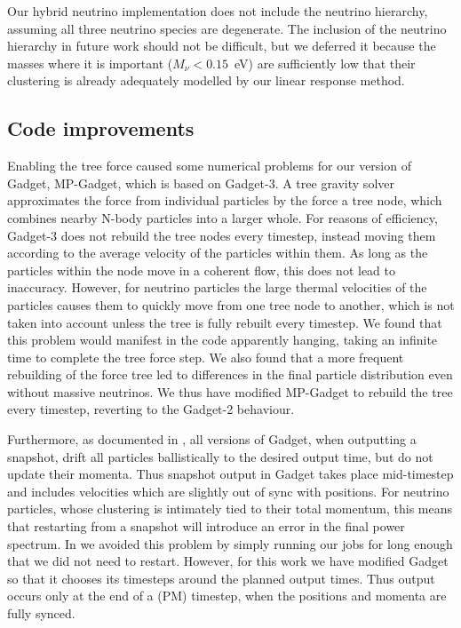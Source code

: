 \documentclass[useAMS, usenatbib]{mnras}
\begin{document}
Our hybrid neutrino implementation does not include the neutrino hierarchy, assuming all three neutrino species are degenerate. The inclusion of the neutrino hierarchy in future work should not be difficult, but we deferred it because the masses where it is important ($M_\nu < 0.15$~eV) are sufficiently low that their clustering is already adequately modelled by our linear response method.

\subsection{Code improvements}
\label{sec:code}

Enabling the tree force caused some numerical problems for our version of Gadget, MP-Gadget, which is based on Gadget-3.
A tree gravity solver approximates the force from individual particles by the force a tree node, which combines nearby N-body particles into a larger whole. For reasons of efficiency, Gadget-3 does not rebuild the tree nodes every timestep, instead moving them according to the average velocity of the particles within them. As long as the particles within the node move in a coherent flow, this does not lead to inaccuracy. However, for neutrino particles the large thermal velocities of the particles causes them to quickly move from one tree node to another, which is not taken into account unless the tree is fully rebuilt every timestep. We found that this problem would manifest in the code apparently hanging, taking an infinite time to complete the tree force step. We also found that a more frequent rebuilding of the force tree led to differences in the final particle distribution even without massive neutrinos. We thus have modified MP-Gadget to rebuild the tree every timestep, reverting to the Gadget-2 behaviour.

Furthermore, as documented in \cite{Springel_2005}, all versions of Gadget, when outputting a snapshot, drift all particles ballistically to the desired output time, but do not update their momenta. Thus snapshot output in Gadget takes place mid-timestep and includes velocities which are slightly out of sync with positions. For neutrino particles, whose clustering is intimately tied to their total momentum, this means that restarting from a snapshot will introduce an error in the final power spectrum. In \cite{AHB} we avoided this problem by simply running our jobs for long enough that we did not need to restart. However, for this work we have modified Gadget so that it chooses its timesteps around the planned output times. Thus output occurs only at the end of a (PM) timestep, when the positions and momenta are fully synced.
\end{document}
